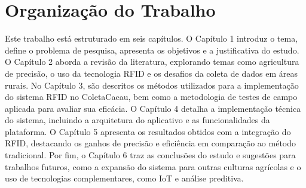\section{Organização do Trabalho}
Este trabalho está estruturado em seis capítulos. O Capítulo 1 introduz o tema, define o problema de pesquisa, apresenta os objetivos e a justificativa do estudo. O Capítulo 2 aborda a revisão da literatura, explorando temas como agricultura de precisão, o uso da tecnologia RFID e os desafios da coleta de dados em áreas rurais. No Capítulo 3, são descritos os métodos utilizados para a implementação do sistema RFID no ColetaCacau, bem como a metodologia de testes de campo aplicada para avaliar sua eficácia. O Capítulo 4 detalha a implementação técnica do sistema, incluindo a arquitetura do aplicativo e as funcionalidades da plataforma. O Capítulo 5 apresenta os resultados obtidos com a integração do RFID, destacando os ganhos de precisão e eficiência em comparação ao método tradicional. Por fim, o Capítulo 6 traz as conclusões do estudo e sugestões para trabalhos futuros, como a expansão do sistema para outras culturas agrícolas e o uso de tecnologias complementares, como IoT e análise preditiva.